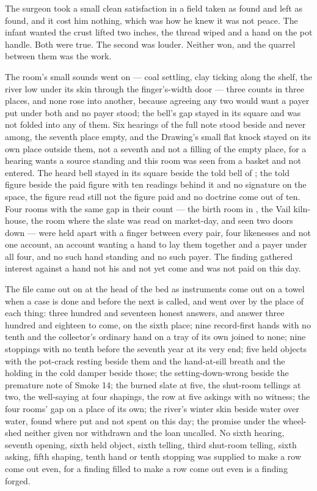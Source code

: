 The surgeon took a small clean satisfaction in a field taken as found and left as found, and it cost him nothing, which was how he knew it was not peace. The infant wanted the crust lifted two inches, the thread wiped and a hand on the pot handle. Both were true. The second was louder. Neither won, and the quarrel between them was the work.

The room's small sounds went on --- coal settling, clay ticking along the shelf, the river low under its skin through the finger's-width door --- three counts in three places, and none rose into another, because agreeing any two would want a payer put under both and no payer stood; the bell's gap stayed in its square and was not folded into any of them. Six hearings of the full note stood beside and never among, the seventh place empty, and the Drawing's small flat knock stayed on its own place outside them, not a seventh and not a filling of the empty place, for a hearing wants a source standing and this room was seen from a basket and not entered. The heard bell stayed in its square beside the told bell of ; the told figure beside the paid figure with ten readings behind it and no signature on the space, the figure read still not the figure paid and no doctrine come out of ten. Four rooms with the same gap in their count --- the birth room in , the Vail kiln-house, the room where the slate was read on market-day, and  seen two doors down --- were held apart with a finger between every pair, four likenesses and not one account, an account wanting a hand to lay them together and a payer under all four, and no such hand standing and no such payer. The finding gathered interest against a hand not his and not yet come and was not paid on this day.

The file came out on  at the head of the bed as instruments come out on a towel when a case is done and before the next is called, and went over by the place of each thing: three hundred and seventeen honest answers, and answer three hundred and eighteen to come, on the sixth place; nine record-first hands with no tenth and the collector's ordinary hand on a tray of its own joined to none; nine stoppings with no tenth before the seventh year at its very end; five held objects with the pot-crack resting beside them and the hand-at-sill breath and the holding in the cold damper beside those; the setting-down-wrong beside the premature note of Smoke 14; the burned slate at five, the shut-room tellings at two, the well-saying at four shapings, the row at five askings with no witness; the four rooms' gap on a place of its own; the river's winter skin beside water over water, found where put and not spent on this day; the promise under the wheel-shed neither given nor withdrawn and the loan uncalled. No sixth hearing, seventh opening, sixth held object, sixth telling, third shut-room telling, sixth asking, fifth shaping, tenth hand or tenth stopping was supplied to make a row come out even, for a finding filled to make a row come out even is a finding forged.


